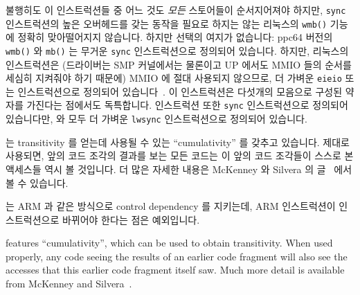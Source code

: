 불행히도 이 인스트럭션들 중 어느 것도 {\em 모든} 스토어들이 순서지어져야
하지만, {\tt sync} 인스트럭션의 높은 오버헤드를 갖는 동작을 필요로 하지는 않는
리눅스의 {\tt wmb()} 기능에 정확히 맞아떨어지지 않습니다.
하지만 선택의 여지가 없습니다: ppc64 버전의 {\tt wmb()} 와 {\tt mb()} 는 무거운
{\tt sync} 인스트럭션으로 정의되어 있습니다.
하지만, 리눅스의  인스트럭션은 (드라이버는 SMP 커널에서는
물론이고 UP 에서도 MMIO 들의 순서를 세심히 지켜줘야 하기 때문에) MMIO 에 절대
사용되지 않으므로, 더 가벼운 {\tt eieio} 또는  인스트럭션으로
정의되어 있습니다~\cite{PaulEMcKenney2016MMIO}.
이 인스트럭션은 다섯개의 모음으로 구성된 약자를 가진다는 점에서도 독특합니다.
 인스트럭션 또한 {\tt sync} 인스트럭션으로 정의되어 있습니다만,
 와  모두 더 가벼운 {\tt lwsync} 인스트럭션으로
정의되어 있습니다.

\Power{} 는 transitivity 를 얻는데 사용될 수 있는 ``cumulativity'' 를 갖추고
있습니다.
제대로 사용되면, 앞의 코드 조각의 결과를 보는 모든 코드는 이 앞의 코드 조각들이
스스로 본 액세스들 역시 볼 것입니다.
더 많은 자세한 내용은 McKenney 와 Silvera 의 글~\cite{PaulEMcKenneyN2745r2009}
에서 볼 수 있습니다.

\Power{} 는 ARM 과 같은 방식으로 control dependency 를 지키는데, ARM 
인스트럭션이 \Power{}  인스트럭션으로 바뀌어야 한다는 점은
예외입니다.
\iffalse

\Power{} features ``cumulativity'', which can be used to obtain
transitivity.
When used properly, any code seeing the results of an earlier
code fragment will also see the accesses that this earlier code
fragment itself saw.
Much more detail is available from
McKenney and Silvera~\cite{PaulEMcKenneyN2745r2009}.

